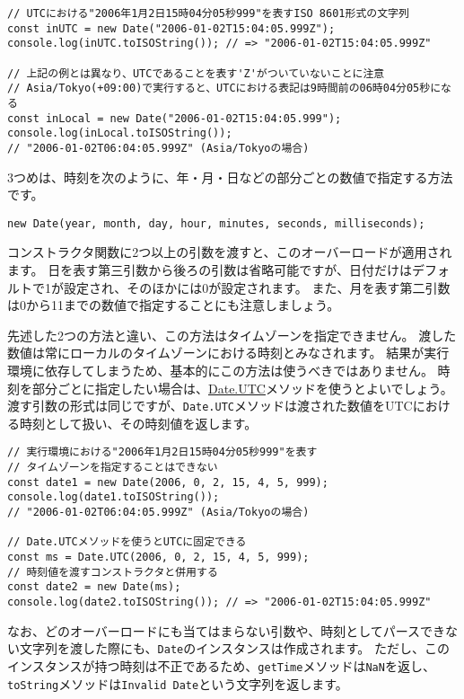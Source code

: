 \begin{lstlisting}
// UTCにおける"2006年1月2日15時04分05秒999"を表すISO 8601形式の文字列
const inUTC = new Date("2006-01-02T15:04:05.999Z");
console.log(inUTC.toISOString()); // => "2006-01-02T15:04:05.999Z"

// 上記の例とは異なり、UTCであることを表す'Z'がついていないことに注意
// Asia/Tokyo(+09:00)で実行すると、UTCにおける表記は9時間前の06時04分05秒になる
const inLocal = new Date("2006-01-02T15:04:05.999");
console.log(inLocal.toISOString()); 
// "2006-01-02T06:04:05.999Z" (Asia/Tokyoの場合)
\end{lstlisting}

3つめは、時刻を次のように、年・月・日などの部分ごとの数値で指定する方法です。

\begin{lstlisting}
new Date(year, month, day, hour, minutes, seconds, milliseconds);
\end{lstlisting}

コンストラクタ関数に2つ以上の引数を渡すと、このオーバーロードが適用されます。
日を表す第三引数から後ろの引数は省略可能ですが、日付だけはデフォルトで1が設定され、そのほかには0が設定されます。
また、月を表す第二引数は0から11までの数値で指定することにも注意しましょう。

先述した2つの方法と違い、この方法はタイムゾーンを指定できません。
渡した数値は常にローカルのタイムゾーンにおける時刻とみなされます。
結果が実行環境に依存してしまうため、基本的にこの方法は使うべきではありません。
時刻を部分ごとに指定したい場合は、\href{https://developer.mozilla.org/ja/docs/Web/JavaScript/Reference/Global_Objects/Date/UTC}{Date.UTC}メソッドを使うとよいでしょう。
渡す引数の形式は同じですが、\texttt{Date.UTC}メソッドは渡された数値をUTCにおける時刻として扱い、その時刻値を返します。

\begin{lstlisting}
// 実行環境における"2006年1月2日15時04分05秒999"を表す
// タイムゾーンを指定することはできない
const date1 = new Date(2006, 0, 2, 15, 4, 5, 999);
console.log(date1.toISOString()); 
// "2006-01-02T06:04:05.999Z" (Asia/Tokyoの場合)

// Date.UTCメソッドを使うとUTCに固定できる
const ms = Date.UTC(2006, 0, 2, 15, 4, 5, 999);
// 時刻値を渡すコンストラクタと併用する
const date2 = new Date(ms);
console.log(date2.toISOString()); // => "2006-01-02T15:04:05.999Z"
\end{lstlisting}

なお、どのオーバーロードにも当てはまらない引数や、時刻としてパースできない文字列を渡した際にも、\texttt{Date}のインスタンスは作成されます。
ただし、このインスタンスが持つ時刻は不正であるため、\texttt{getTime}メソッドは\texttt{NaN}を返し、\texttt{toString}メソッドは\texttt{Invalid Date}という文字列を返します。

